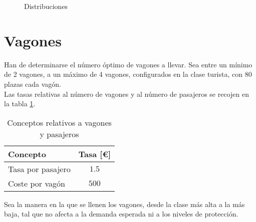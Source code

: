 \documentclass[12pt]{article}
\begin{document}
\begin{figure}
\centering



\caption{Distribuciones}\label{fig:tablag}
\end{figure}



\section{Vagones}

Han de determinarse el número óptimo de vagones a llevar. Sea entre un mínimo de 2 vagones, a un máximo de 4 vagones, configurados en la clase turista, con 80 plazas cada vagón.\\


Las tasas relativas al número de vagones y al número de pasajeros se recojen en la tabla \ref{tab:vag}.




\begin{table}[!htp]\centering

\begin{tabular}{lc}\toprule
Concepto & Tasa [\euro] \\\midrule
Tasa por pasajero & $1.5$\\
Coste por vagón & $500$\\
\bottomrule
\end{tabular}

\caption{Conceptos relativos a vagones y pasajeros}\label{tab:vag}
\end{table}


Sea la manera en la que se llenen los vagones, desde la clase más alta a la más baja, tal que no afecta a la demanda esperada ni a los niveles de protección.\\
\end{document}
